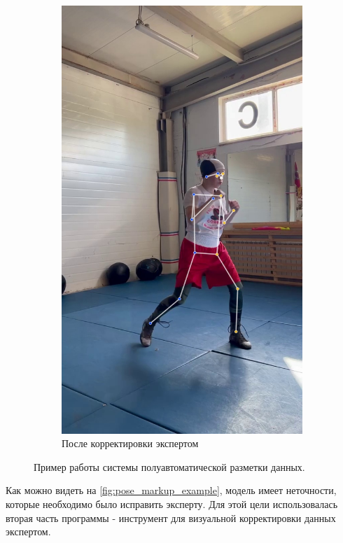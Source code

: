 \begin{figure}[h]
\begin{subfigure}[b]{0.32\textwidth}
	\includegraphics[width=\textwidth]{./images/experiment/data_info/pose_markup_examples/correct_labels}
	\caption{После корректировки экспертом}
\end{subfigure}
\caption{Пример работы системы полуавтоматической разметки данных.}
\label{fig:pose_markup_example}
\end{figure}

Как можно видеть на \autoref{fig:pose_markup_example}, модель имеет неточности, которые необходимо было исправить эксперту. Для этой цели использовалась вторая часть программы - инструмент для визуальной корректировки данных экспертом. 

